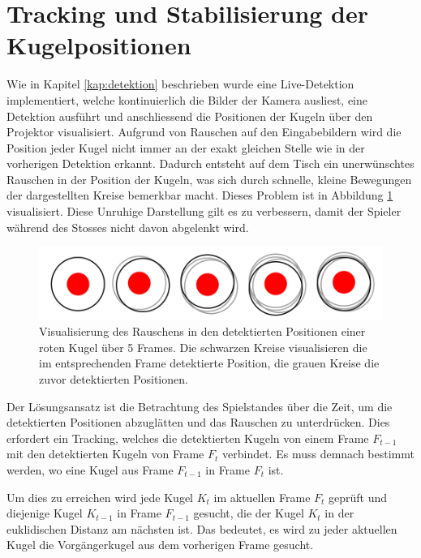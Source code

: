 \section{Tracking und Stabilisierung der Kugelpositionen}\label{kap:tracking}
Wie in Kapitel \ref{kap:detektion} beschrieben wurde eine Live-Detektion implementiert, welche kontinuierlich
die Bilder der Kamera ausliest, eine Detektion ausführt und anschliessend die Positionen der Kugeln über den Projektor
visualisiert.
Aufgrund von Rauschen auf den Eingabebildern wird die Position jeder Kugel nicht immer an der exakt gleichen Stelle wie
in der vorherigen Detektion erkannt. Dadurch entsteht auf dem Tisch ein unerwünschtes Rauschen in der Position der Kugeln,
was sich durch schnelle, kleine Bewegungen der dargestellten Kreise bemerkbar macht.
Dieses Problem ist in Abbildung \ref{fig:tracking_detected_positions_over_time} visualisiert.
Diese Unruhige Darstellung gilt es zu verbessern, damit der Spieler während des Stosses nicht davon abgelenkt wird.

\begin{figure}[h!]
    \begin{center}
        \includegraphics[width=0.6\linewidth]{../common/03_billiard_ai/resources/tracking_detected_positions_over_time.png}
    \end{center}
    \caption{Visualisierung des Rauschens in den detektierten Positionen einer roten Kugel über 5 Frames. Die schwarzen Kreise visualisieren die im entsprechenden Frame detektierte Position, die grauen Kreise die zuvor detektierten Positionen.}
    \label{fig:tracking_detected_positions_over_time}
\end{figure}

Der Lösungsansatz ist die Betrachtung des Spielstandes über die Zeit, um die detektierten Positionen abzuglätten und
das Rauschen zu unterdrücken.
Dies erfordert ein Tracking, welches die detektierten Kugeln von einem Frame $F_{t-1}$ mit den detektierten Kugeln
von Frame $F_{t}$ verbindet. Es muss demnach bestimmt werden, wo eine Kugel aus Frame $F_{t-1}$ in Frame $F_{t}$ ist.

Um dies zu erreichen wird jede Kugel $K_{t}$ im aktuellen Frame $F_{t}$ geprüft und diejenige Kugel $K_{t-1}$
in Frame $F_{t-1}$ gesucht, die der Kugel $K_{t}$ in der euklidischen Distanz am nächsten ist.
Das bedeutet, es wird zu jeder aktuellen Kugel die Vorgängerkugel aus dem vorherigen Frame gesucht.

